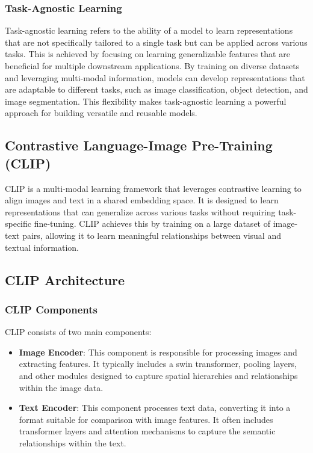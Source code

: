 \subsubsection{Task-Agnostic Learning}
\label{subsec:task_agnostic_learning}
Task-agnostic learning refers to the ability of a model to learn representations that are not specifically tailored to a single task but can be applied across various tasks. This is achieved by focusing on learning generalizable features that are beneficial for multiple downstream applications. By training on diverse datasets and leveraging multi-modal information, models can develop representations that are adaptable to different tasks, such as image classification, object detection, and image segmentation. This flexibility makes task-agnostic learning a powerful approach for building versatile and reusable models.

\subsection{Contrastive Language-Image Pre-Training (CLIP)}
\label{subsec:clip}

CLIP \cite{vl_clip} is a multi-modal learning framework that leverages contrastive learning to align images and text in a shared embedding space. It is designed to learn representations that can generalize across various tasks without requiring task-specific fine-tuning. CLIP achieves this by training on a large dataset of image-text pairs, allowing it to learn meaningful relationships between visual and textual information.

\subsection{CLIP Architecture}
\label{subsec:clip_architecture}

\subsubsection{CLIP Components}
CLIP consists of two main components:

\begin{itemize}
    \item \textbf{Image Encoder}: This component is responsible for processing images and extracting features. It typically includes a swin transformer, pooling layers, and other modules designed to capture spatial hierarchies and relationships within the image data.
    \item \textbf{Text Encoder}: This component processes text data, converting it into a format suitable for comparison with image features. It often includes transformer layers and attention mechanisms to capture the semantic relationships within the text.
\end{itemize}


